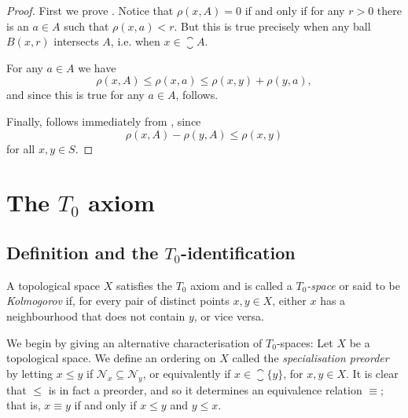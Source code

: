 \documentclass[article, a4paper, 11pt, oneside]{memoir}
\numberwithin{equation}{chapter}
\newcommand{\calN}{\mathcal{N}}
\newcommand{\nhoodfilter}[1]{\calN_{#1}}
\begin{document}
\begin{proof}
    First we prove . Notice that $\rho(x,A) = 0$ if and only if for any $r > 0$ there is an $a \in A$ such that $\rho(x,a) < r$. But this is true precisely when any ball $B(x,r)$ intersects $A$, i.e. when $x \in \closure{A}$.

    For any $a \in A$ we have
    \begin{equation*}
        \rho(x,A)
            \leq \rho(x,a)
            \leq \rho(x,y) + \rho(y,a),
    \end{equation*}
    and since this is true for any $a \in A$,  follows.

    Finally,  follows immediately from , since
    \begin{equation*}
        \rho(x,A) - \rho(y,A)
            \leq \rho(x,y)
    \end{equation*}
    for all $x,y \in S$.
\end{proof}



\chapter[The T0 axiom][The $T_0$ axiom]{The $T_0$ axiom}

\section[Definition and the T0-identification][Definition and the $T_0$-identification]{Definition and the $T_0$-identification}

\begin{definition}
    A topological space $X$ satisfies the $T_0$ axiom and is called a \emph{$T_0$-space} or said to be \emph{Kolmogorov} if, for every pair of distinct points $x,y \in X$, either $x$ has a neighbourhood that does not contain $y$, or vice versa.
\end{definition}

We begin by giving an alternative characterisation of $T_0$-spaces: Let $X$ be a topological space. We define an ordering on $X$ called the \emph{specialisation preorder} by letting $x \leq y$ if $\nhoodfilter{x} \subseteq \nhoodfilter{y}$, or equivalently if $x \in \closure{\{y\}}$, for $x,y \in X$. It is clear that $\leq$ is in fact a preorder, and so it determines an equivalence relation $\equiv$; that is, $x \equiv y$ if and only if $x \leq y$ and $y \leq x$.
\end{document}
